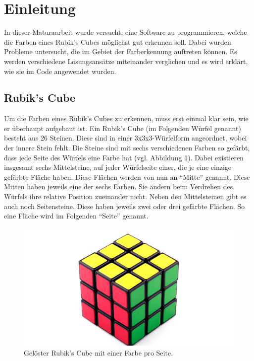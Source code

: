 \documentclass[a4paper, 12pt]{article}
\begin{document}
\section{Einleitung}
In dieser Maturaarbeit wurde versucht, eine Software zu programmieren, welche die Farben eines Rubik's Cubes möglichst gut erkennen soll. Dabei wurden Probleme untersucht, die im Gebiet der Farberkennung auftreten können. Es werden verschiedene Lösungsansätze miteinander verglichen und es wird erklärt, wie sie im Code angewendet wurden.
\subsection{Rubik's Cube}
Um die Farben eines Rubik's Cubes zu erkennen, muss erst einmal klar sein, wie er überhaupt aufgebaut ist. Ein Rubik's Cube (im Folgenden Würfel genannt) besteht aus 26 Steinen. Diese sind in einer 3x3x3-Würfelform angeordnet, wobei der innere Stein fehlt. Die Steine sind mit sechs verschiedenen Farben so gefärbt, dass jede Seite des Würfels eine Farbe hat (vgl. Abbildung 1).
\newline
Dabei existieren insgesamt sechs Mittelsteine, auf jeder Würfelseite einer, die je eine einzige gefärbte Fläche haben. Diese Flächen werden von nun an "`Mitte"' genannt. Diese Mitten haben jeweils eine der sechs Farben. Sie ändern beim Verdrehen des Würfels ihre relative Position zueinander nicht.
\newline
Neben den Mittelsteinen gibt es auch noch Seitensteine. Diese haben jeweils zwei oder drei gefärbte Flächen. So eine Fläche wird im Folgenden "`Seite"' genannt.
\begin{figure}[h]
\includegraphics[scale=1.5]{Wuerfel_Billd}
\caption{Gelöster Rubik's Cube mit einer Farbe pro Seite. \cite{Wuerfelbild}}
\end{figure}
\end{document}
